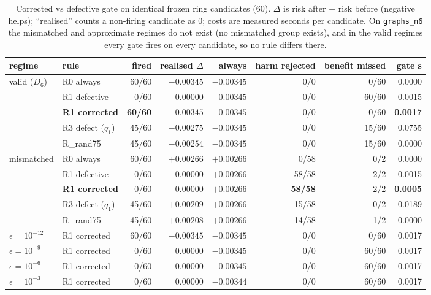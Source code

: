 \documentclass{neurips_2024}
\begin{document}
\begin{table}[t]
\centering
\caption{Corrected vs defective gate on identical frozen ring candidates ($60$).
$\Delta$ is risk after $-$ risk before (negative helps); ``realised'' counts a non-firing
candidate as $0$; costs are measured seconds per candidate. On \texttt{graphs\_n6} the
mismatched and approximate regimes do not exist (no mismatched group exists), and in the valid
regimes every gate fires on every candidate, so no rule differs there.}
\label{tab:corrected}
\small
\begin{tabular}{@{}llrrrrrr@{}}
\toprule
regime & rule & fired & realised $\Delta$ & always & harm rejected & benefit missed & gate s \\
\midrule
valid ($D_6$) & R0 always            & 60/60 & $-0.00345$ & $-0.00345$ & 0/0   & 0/60   & 0.0000 \\
              & R1 defective         & 0/60  & $0.00000$  & $-0.00345$ & 0/0   & 60/60  & 0.0015 \\
              & \textbf{R1 corrected} & \textbf{60/60} & $\mathbf{-0.00345}$ & $-0.00345$ & 0/0 & 0/60 & \textbf{0.0017} \\
              & R3 defect ($q_1$)    & 45/60 & $-0.00275$ & $-0.00345$ & 0/0   & 15/60  & 0.0755 \\
              & R\_rand75            & 45/60 & $-0.00254$ & $-0.00345$ & 0/0   & 15/60  & 0.0000 \\
\midrule
mismatched    & R0 always            & 60/60 & $+0.00266$ & $+0.00266$ & 0/58  & 0/2    & 0.0000 \\
              & R1 defective         & 0/60  & $0.00000$  & $+0.00266$ & 58/58 & 2/2    & 0.0015 \\
              & \textbf{R1 corrected} & 0/60 & $\mathbf{0.00000}$ & $+0.00266$ & \textbf{58/58} & 2/2 & \textbf{0.0005} \\
              & R3 defect ($q_1$)    & 45/60 & $+0.00209$ & $+0.00266$ & 15/58 & 0/2    & 0.0189 \\
              & R\_rand75            & 45/60 & $+0.00208$ & $+0.00266$ & 14/58 & 1/2    & 0.0000 \\
\midrule
$\epsilon{=}10^{-12}$ & R1 corrected   & 60/60 & $-0.00345$ & $-0.00345$ & 0/0 & 0/60 & 0.0017 \\
$\epsilon{=}10^{-9}$  & R1 corrected   & 0/60  & $0.00000$  & $-0.00345$ & 0/0 & 60/60 & 0.0017 \\
$\epsilon{=}10^{-6}$  & R1 corrected   & 0/60  & $0.00000$  & $-0.00345$ & 0/0 & 60/60 & 0.0017 \\
$\epsilon{=}10^{-3}$  & R1 corrected   & 0/60  & $0.00000$  & $-0.00344$ & 0/0 & 60/60 & 0.0017 \\
\bottomrule
\end{tabular}
\end{table}
\end{document}
